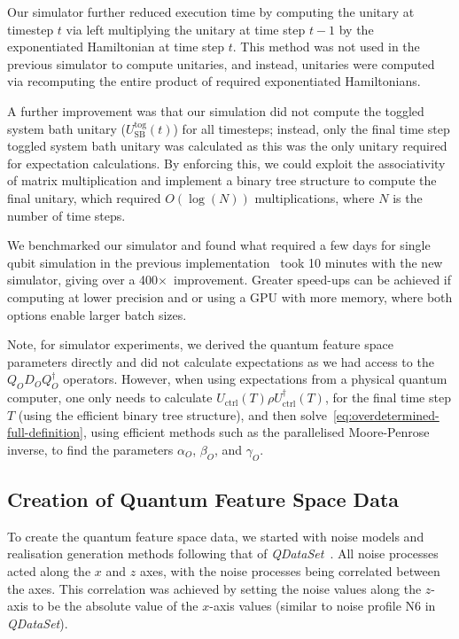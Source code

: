 \documentclass[12pt]{iopart}
\begin{document}
Our simulator further reduced execution time by computing the unitary at timestep $t$ via left multiplying the unitary at time step $t-1$ by the exponentiated Hamiltonian at time step $t$. This method was not used in the previous simulator to compute unitaries, and instead, unitaries were computed via recomputing the entire product of required exponentiated Hamiltonians.

A further improvement was that our simulation did not compute the toggled system bath unitary ($U_{\mathrm{SB}}^{\mathrm{tog}}(t)$) for all timesteps; instead, only the final time step toggled system bath unitary was calculated as this was the only unitary required for expectation calculations. By enforcing this, we could exploit the associativity of matrix multiplication and implement a binary tree structure to compute the final unitary, which required $O(\log(N))$ multiplications, where $N$ is the number of time steps.

We benchmarked our simulator and found what required a few days for single qubit simulation in the previous implementation~\cite{perrier2022qdataset} took 10 minutes with the new simulator, giving over a 400$\times$~improvement. Greater speed-ups can be achieved if computing at lower precision and or using a GPU with more memory, where both options enable larger batch sizes.

Note, for simulator experiments, we derived the quantum feature space parameters directly and did not calculate expectations as we had access to the $Q_{O}D_{O}Q_{O}^{\dagger}$ operators. However, when using expectations from a physical quantum computer, one only needs to calculate $U_{\mathrm{ctrl}}(T) \rho U_{\mathrm{ctrl}}^{\dagger}(T)$, for the final time step $T$ (using the efficient binary tree structure), and then solve~\cref{eq:overdetermined-full-definition}, using efficient methods such as the parallelised Moore-Penrose inverse, to find the parameters $\alpha_O$, $\beta_O$, and $\gamma_O$.
\subsection{Creation of Quantum Feature Space Data \label{subsec:creation_of_quantum_feature_space_data}}
To create the quantum feature space data, we started with noise models and realisation generation methods following that of \textit{QDataSet}~\cite{perrier2022qdataset}. All noise processes acted along the $x$ and $z$ axes, with the noise processes being correlated between the axes. This correlation was achieved by setting the noise values along the $z$-axis to be the absolute value of the $x$-axis values (similar to noise profile N6 in \textit{QDataSet}).
\end{document}
